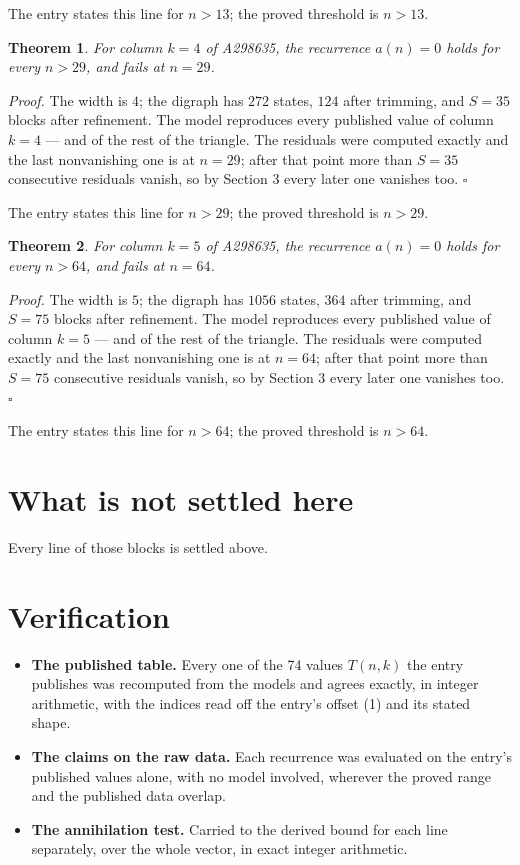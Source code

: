 \documentclass[11pt]{article}
\newtheorem{theorem}{Theorem}
\theoremstyle{definition}
\begin{document}
The entry states this line for $n > 13$; the proved threshold is $n > 13$.

\begin{theorem} For column $k = 4$ of A298635, the recurrence $a(n) = 0$ holds for every $n > 29$, and fails at $n = 29$.\end{theorem}

{\itshape Proof.} The width is $4$; the digraph has $272$ states, $124$ after trimming, and $S = 35$ blocks after refinement. The model reproduces every published value of column $k = 4$ --- and of the rest of the triangle. The residuals were computed exactly and the last nonvanishing one is at $n = 29$; after that point more than $S = 35$ consecutive residuals vanish, so by Section 3 every later one vanishes too. $\square$

The entry states this line for $n > 29$; the proved threshold is $n > 29$.

\begin{theorem} For column $k = 5$ of A298635, the recurrence $a(n) = 0$ holds for every $n > 64$, and fails at $n = 64$.\end{theorem}

{\itshape Proof.} The width is $5$; the digraph has $1056$ states, $364$ after trimming, and $S = 75$ blocks after refinement. The model reproduces every published value of column $k = 5$ --- and of the rest of the triangle. The residuals were computed exactly and the last nonvanishing one is at $n = 64$; after that point more than $S = 75$ consecutive residuals vanish, so by Section 3 every later one vanishes too. $\square$

The entry states this line for $n > 64$; the proved threshold is $n > 64$.

\section{What is not settled here}

Every line of those blocks is settled above.

\section{Verification}

\begin{itemize}

\item {\bfseries The published table.} Every one of the 74 values $T(n,k)$ the entry publishes was recomputed from the models and agrees exactly, in integer arithmetic, with the indices read off the entry's offset (1) and its stated shape.

\item {\bfseries The claims on the raw data.} Each recurrence was evaluated on the entry's published values alone, with no model involved, wherever the proved range and the published data overlap.

\item {\bfseries The annihilation test.} Carried to the derived bound for each line separately, over the whole vector, in exact integer arithmetic.

\end{itemize}
\end{document}
